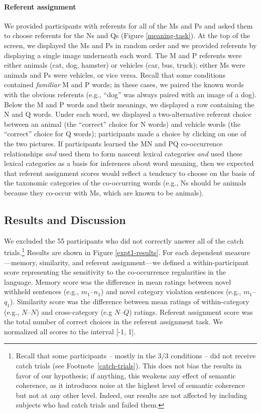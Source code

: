 \documentclass[man,floatsintext]{apa6}
\begin{document}
\paragraph{Referent assignment}
We provided participants with referents for all of the Ms and Ps and asked them to choose referents for the Ns and Qs (Figure \ref{meaning-task}). At the top of the screen, we displayed the Ms and Ps in random order and we provided referents by displaying a single image underneath each word. The M and P referents were either animals (cat, dog, hamster) or vehicles (car, bus, truck); either Ms were animals and Ps were vehicles, or vice versa. Recall that some conditions contained \emph{familiar} M and P words; in these cases, we paired the known words with the obvious referents (e.g., ``dog'' was always paired with an image of a dog). Below the M and P words and their meanings, we displayed a row containing the N and Q words. Under each word, we displayed a two-alternative referent choice between an animal (the ``correct'' choice for N words) and vehicle words (the ``correct'' choice for Q words); participants made a choice by clicking on one of the two pictures. If participants learned the MN and PQ co-occurrence relationships \emph{and} used them to form nascent lexical categories \emph{and} used these lexical categories as a basis for inferences about word meaning, then we expected that referent assignment scores would reflect a tendency to choose on the basis of the taxonomic categories of the co-occurring words (e.g., Ns should be animals because they co-occur with Ms, which are known to be animals).

\subsection{Results and Discussion}
We excluded the 55 participants who did not correctly answer all of the catch trials.\footnote{ Recall that some participants -- mostly in the 3/3 conditions --  did not receive catch trials (see Footnote~\ref{catch-trials}). This does not bias the results in favor of our hypothesis; if anything, this weakens any effect of semantic coherence, as it introduces noise at the highest level of semantic coherence but not at any other level. Indeed, our results are not affected by including subjects who had catch trials and failed them.} Results are shown in Figure \ref{expt1-results}. For each dependent measure---memory, similarity, and referent assignment---we defined a within-participant score representing the sensitivity to the co-occurrence regularities in the language. Memory score was the difference in mean ratings between novel withheld sentences (e.g., $m_1$--$n_1$) and novel category violation sentences (e.g., $m_1$--$q_1$). Similarity score was the difference between mean ratings of within-category (e.g., $N$--$N$) and cross-category (e.g $N$--$Q$) ratings. Referent assignment score was the total number of correct choices in the referent assignment task. We normalized all scores to the interval [-1, 1].
\end{document}
